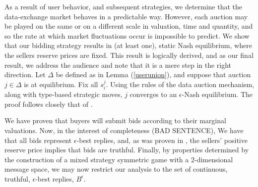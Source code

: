 As a result of user behavior, and subsequent strategies, we determine that the
data-exchange market behaves in a predictable way. However,
each auction may be played on the same or on a different scale in
valuation, time and quantity, and so the rate at which market fluctuations occur is
impossible to predict. 
We show that our bidding strategy results in (at least one), static Nash
equilibrium, where the sellers reserve prices are fixed. This result is
logically derived, and as our final result, we address the audience and note
that it is a mere step in the right direction.
{
Let $\Delta$ be defined as in Lemma (\ref{userunion}), and suppose that auction
$j\in\Delta$ is at equilibrium. Fix all $s_i^j$. 
Using the rules of the data auction mechanism, along with type-based strategic
moves, $j$ converges to an $\epsilon$-Nash equilibrium. 
The proof follows closely that of \cite{semret}.
}\\

We have proven that buyers will submit bids according to their marginal
valuations. Now, in the interest of completeness (BAD SENTENCE), 
We have that all bids represent $\epsilon$-best replies, and, as was proven in
\cite{lazar}, the sellers' positive reserve price implies that bids are
truthful. Finally, by properties determined by the construction of a mixed strategy
symmetric game with a 2-dimensional message space, we may now restrict our
analysis to the set of continuous, truthful, $\epsilon$-best replies, $B^\epsilon$.

{
}

